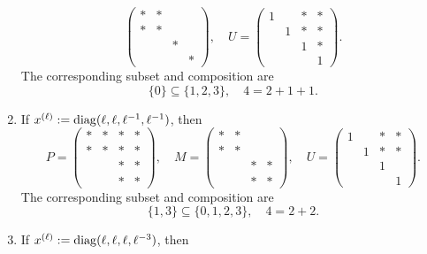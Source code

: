 \documentclass[reqno]{amsart} 
\begin{document}
\begin{example}
\begin{enumerate}
\begin{equation*}
\begin{pmatrix}
        \ast & \ast &  &  \\
        \ast & \ast &  &  \\
             &  & \ast & \\
             & &  & \ast
      \end{pmatrix}
      , \quad U = 
      \begin{pmatrix}
        1 &  & \ast & \ast \\
          & 1 & \ast & \ast \\
          &  & 1 & \ast \\
          & & & 1
      \end{pmatrix}
      .
    \end{equation*}
    The corresponding subset and composition are
    \begin{equation*}
      \{0\} \subseteq \{1,2,3\},
      \quad
      4 = 2 + 1+1.
    \end{equation*}
  \item \label{itm:stoes2021:1} If $x^{(\ell)} := \operatorname{diag}(\ell, \ell, \ell^{-1}, \ell^{-1})$, then
    \begin{equation*}
      P = 
      \begin{pmatrix}
        \ast & \ast & \ast & \ast \\
        \ast & \ast & \ast & \ast \\
             &  & \ast & \ast \\
             & & \ast & \ast
      \end{pmatrix}
      , \quad M = 
      \begin{pmatrix}
        \ast & \ast &  &  \\
        \ast & \ast &  &  \\
             &  & \ast & \ast \\
             & & \ast & \ast
      \end{pmatrix}
      , \quad U = 
      \begin{pmatrix}
        1 &  & \ast & \ast \\
          & 1 & \ast & \ast \\
          &  & 1 &  \\
          & & & 1
      \end{pmatrix}
      .
    \end{equation*}
    The corresponding subset and composition are
    \begin{equation*}
      \{1,3\} \subseteq \{0,1,2,3\},
      \quad
      4 = 2 + 2.
    \end{equation*}
  \item \label{itm:stoes2021:2} If $x^{(\ell)} := \operatorname{diag}(\ell, \ell, \ell, \ell^{-3})$, then

\end{enumerate}
\end{example}
\end{document}
